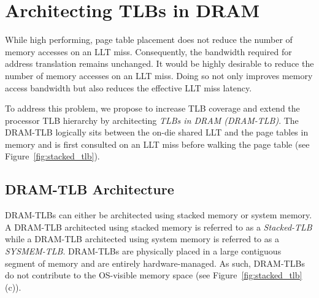 \section{Architecting TLBs in DRAM } 
\label{sec:stackedTLB}

\noindent While high performing, page table placement does not reduce
the number of memory accesses on an LLT miss. Consequently, the
bandwidth required for address translation remains unchanged. It would
be highly desirable to reduce the number of memory accesses on an LLT
miss. Doing so not only improves memory access bandwidth but also
reduces the effective LLT miss latency.

To address this problem, we propose to increase TLB coverage and
extend the processor TLB hierarchy by architecting {\em TLBs in DRAM
(DRAM-TLB)}. The DRAM-TLB logically sits between the on-die shared LLT
and the page tables in memory and is first consulted on an LLT miss
before walking the page table (see Figure~\ref{fig:stacked_tlb}).


\begin{figure*}[t] 
  \vspace{-0. in} \centering
   \centerline{}

  \caption{\small Improving TLB coverage by embedding TLBs in DRAM
    (DRAM-TLB). A DRAM-TLB architected using commodity DRAM is called
    SYSMEM-TLB and a DRAM-TLB architected with stacked DRAM is called
    Stacked-TLB. \normalsize}
  \label{fig:stacked_tlb} 
  \vspace{-0. in}
\end{figure*}

\subsection{DRAM-TLB Architecture}

\noindent DRAM-TLBs can either be architected using stacked memory or
system memory. A DRAM-TLB architected using stacked memory is referred
to as a {\em Stacked-TLB} while a DRAM-TLB architected using system
memory is referred to as a {\em SYSMEM-TLB}. DRAM-TLBs are physically
placed in a large contiguous segment of memory and are entirely
hardware-managed. As such, DRAM-TLBs do not contribute to the
OS-visible memory space (see Figure~\ref{fig:stacked_tlb}(c)).

